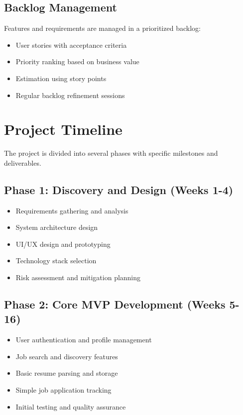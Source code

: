 \documentclass[12pt,a4paper]{report}
\begin{document}
\subsection{Backlog Management}
Features and requirements are managed in a prioritized backlog:
\begin{itemize}[leftmargin=2em]
  \item User stories with acceptance criteria
  \item Priority ranking based on business value
  \item Estimation using story points
  \item Regular backlog refinement sessions
\end{itemize}

\section{Project Timeline}
The project is divided into several phases with specific milestones and deliverables.

\subsection{Phase 1: Discovery and Design (Weeks 1-4)}
\begin{itemize}[leftmargin=2em]
  \item Requirements gathering and analysis
  \item System architecture design
  \item UI/UX design and prototyping
  \item Technology stack selection
  \item Risk assessment and mitigation planning
\end{itemize}

\subsection{Phase 2: Core MVP Development (Weeks 5-16)}
\begin{itemize}[leftmargin=2em]
  \item User authentication and profile management
  \item Job search and discovery features
  \item Basic resume parsing and storage
  \item Simple job application tracking
  \item Initial testing and quality assurance
\end{itemize}
\end{document}
